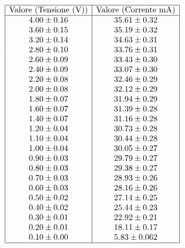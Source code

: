 \documentclass[a4paper,11pt]{article}
\begin{document}
\[
\begin{array}{|c|c|}
\hline
\text{Valore (Tensione (V))} & \text{Valore (Corrente mA)} \\ \hline
4.00 \pm 0.16 & 35.61 \pm 0.32 \\ 
3.60 \pm 0.15 & 35.19 \pm 0.32 \\ 
3.20 \pm 0.14 & 34.63 \pm 0.31 \\ 
2.80 \pm 0.10 & 33.76 \pm 0.31 \\ 
2.60 \pm 0.09 & 33.43 \pm 0.30 \\ 
2.40 \pm 0.09 & 33.07 \pm 0.30 \\ 
2.20 \pm 0.08 & 32.46 \pm 0.29 \\ 
2.00 \pm 0.08 & 32.12 \pm 0.29 \\ 
1.80 \pm 0.07 & 31.94 \pm 0.29 \\ 
1.60 \pm 0.07 & 31.39 \pm 0.28 \\ 
1.40 \pm 0.07 & 31.16 \pm 0.28 \\ 
1.20 \pm 0.04 & 30.73 \pm 0.28 \\ 
1.10 \pm 0.04 & 30.44 \pm 0.28 \\ 
1.00 \pm 0.04 & 30.05 \pm 0.27 \\ 
0.90 \pm 0.03 & 29.79 \pm 0.27 \\ 
0.80 \pm 0.03 & 29.38 \pm 0.27 \\ 
0.70 \pm 0.03 & 28.93 \pm 0.26 \\ 
0.60 \pm 0.03 & 28.16 \pm 0.26 \\ 
0.50 \pm 0.02 & 27.14 \pm 0.25 \\ 
0.40 \pm 0.02 & 25.44 \pm 0.23 \\ 
0.30 \pm 0.01 & 22.92 \pm 0.21 \\ 
0.20 \pm 0.01 & 18.11 \pm 0.17 \\ 
0.10 \pm 0.00 & 5.83 \pm 0.062 \\ \hline
\end{array}
\]
\end{document}
